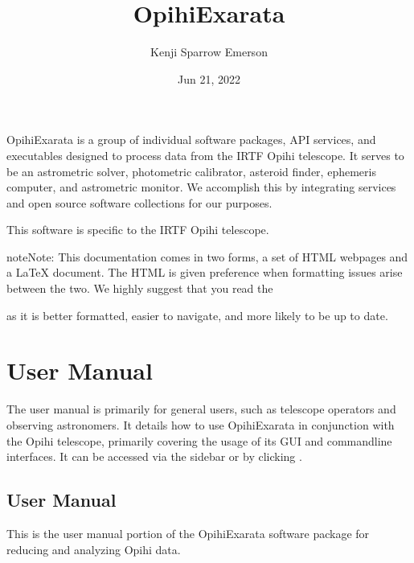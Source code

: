 \documentclass[letterpaper,11pt,english]{sphinxmanual}
\title{OpihiExarata}
\date{Jun 21, 2022}
\author{Kenji Sparrow Emerson}
\begin{document}
\pagestyle{empty}
\sphinxmaketitle
\pagestyle{plain}
\sphinxtableofcontents
\pagestyle{normal}
\label{\detokenize{index::doc}}


\sphinxAtStartPar
OpihiExarata is a group of individual software packages, API services, and
executables designed to process data from the IRTF Opihi telescope. It serves
to be an astrometric solver, photometric calibrator, asteroid finder,
ephemeris computer, and astrometric monitor. We accomplish this by integrating
services and open source software collections for our purposes.

\sphinxAtStartPar
This software is specific to the IRTF Opihi telescope.

\begin{sphinxadmonition}{note}{Note:}
\sphinxAtStartPar
This documentation comes in two forms, a set of HTML webpages and a LaTeX
document. The HTML is given preference when formatting issues arise between
the two. We highly suggest that you read the
%
\begin{footnote}[1]\sphinxAtStartFootnote
{}
%
\end{footnote} as it is
better formatted, easier to navigate, and more likely to be up to date.
\end{sphinxadmonition}


\chapter{User Manual}
\label{\detokenize{index:user-manual}}\label{\detokenize{index:home-user-manual}}
\sphinxAtStartPar
The user manual is primarily for general users, such as telescope operators and
observing astronomers. It details how to use OpihiExarata in conjunction with
the Opihi telescope, primarily covering the usage of its GUI and command\sphinxhyphen{}line
interfaces. It can be accessed via the sidebar or by clicking
{\hyperref[\detokenize{user/index::doc}]{}}.

\sphinxstepscope


\section{User Manual}
\label{\detokenize{user/index:user-manual}}\label{\detokenize{user/index:user-index}}\label{\detokenize{user/index::doc}}
\sphinxAtStartPar
This is the user manual portion of the OpihiExarata software package for
reducing and analyzing Opihi data.
\end{document}
